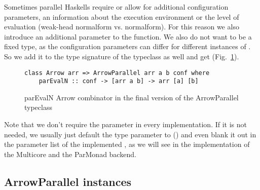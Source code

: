Sometimes parallel Haskells require or allow for additional configuration parameters, \eg an information about the execution environment or the level of evaluation (weak-head normalform vs. normalform). For this reason we also introduce an additional  parameter to the function. We also do not want  to be a fixed type, as the configuration parameters can differ for different instances of . So we add it to the type signature of the typeclass as well and get  (Fig.~\ref{fig:parEvalNArrowTypeClassFinal}).
\begin{figure}[h]
\begin{lstlisting}[frame=htrbl]
class Arrow arr => ArrowParallel arr a b conf where
	parEvalN :: conf -> [arr a b] -> arr [a] [b]
\end{lstlisting}
\caption{parEvalN Arrow combinator in the final version of the ArrowParallel typeclass}
\label{fig:parEvalNArrowTypeClassFinal}
\end{figure}
Note that we don't require the  parameter in every implementation. If it is not needed, we usually just default the  type parameter to () and even blank it out in the parameter list of the implemented , as we will see in the implementation of the Multicore and the ParMonad backend.

\subsection{ArrowParallel instances}

